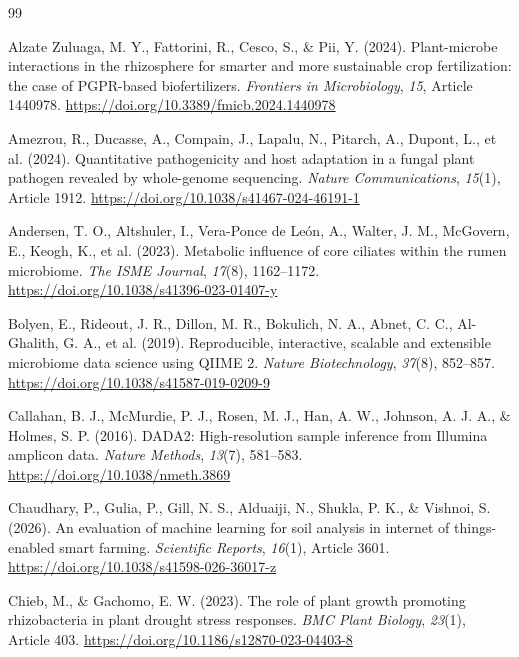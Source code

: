 \renewcommand{\bibname}{บรรณานุกรมมาตรฐาน APA 7th Edition}
\begin{thebibliography}{99}

 Alzate Zuluaga, M. Y., Fattorini, R., Cesco, S., \& Pii, Y. (2024). Plant-microbe interactions in the rhizosphere for smarter and more sustainable crop fertilization: the case of PGPR-based biofertilizers. \textit{Frontiers in Microbiology}, \textit{15}, Article 1440978. \url{https://doi.org/10.3389/fmicb.2024.1440978}

 Amezrou, R., Ducasse, A., Compain, J., Lapalu, N., Pitarch, A., Dupont, L., et al. (2024). Quantitative pathogenicity and host adaptation in a fungal plant pathogen revealed by whole-genome sequencing. \textit{Nature Communications}, \textit{15}(1), Article 1912. \url{https://doi.org/10.1038/s41467-024-46191-1}

 Andersen, T. O., Altshuler, I., Vera-Ponce de León, A., Walter, J. M., McGovern, E., Keogh, K., et al. (2023). Metabolic influence of core ciliates within the rumen microbiome. \textit{The ISME Journal}, \textit{17}(8), 1162--1172. \url{https://doi.org/10.1038/s41396-023-01407-y}

 Bolyen, E., Rideout, J. R., Dillon, M. R., Bokulich, N. A., Abnet, C. C., Al-Ghalith, G. A., et al. (2019). Reproducible, interactive, scalable and extensible microbiome data science using QIIME 2. \textit{Nature Biotechnology}, \textit{37}(8), 852--857. \url{https://doi.org/10.1038/s41587-019-0209-9}

 Callahan, B. J., McMurdie, P. J., Rosen, M. J., Han, A. W., Johnson, A. J. A., \& Holmes, S. P. (2016). DADA2: High-resolution sample inference from Illumina amplicon data. \textit{Nature Methods}, \textit{13}(7), 581--583. \url{https://doi.org/10.1038/nmeth.3869}

 Chaudhary, P., Gulia, P., Gill, N. S., Alduaiji, N., Shukla, P. K., \& Vishnoi, S. (2026). An evaluation of machine learning for soil analysis in internet of things-enabled smart farming. \textit{Scientific Reports}, \textit{16}(1), Article 3601. \url{https://doi.org/10.1038/s41598-026-36017-z}

 Chieb, M., \& Gachomo, E. W. (2023). The role of plant growth promoting rhizobacteria in plant drought stress responses. \textit{BMC Plant Biology}, \textit{23}(1), Article 403. \url{https://doi.org/10.1186/s12870-023-04403-8}


\end{thebibliography}
